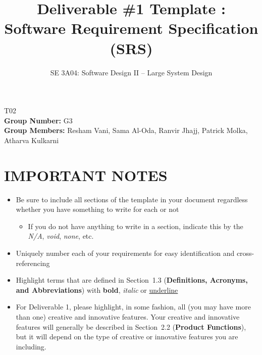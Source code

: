 \documentclass[]{article}
\title{Deliverable \#1 Template : Software Requirement Specification (SRS)}
\author{SE 3A04: Software Design II -- Large System Design}
\date{}
\begin{document}







\maketitle	
{} T02\\
{\bf Group Number:} G3 \\
{\bf Group Members:} Resham Vani, Sama Al-Oda, Ranvir Jhajj, Patrick Molka, Atharva Kulkarni

\section*{IMPORTANT NOTES}
\begin{itemize}
	\item Be sure to include all sections of the template in your document regardless whether you have something to write for each or not
	\begin{itemize}
		\item If you do not have anything to write in a section, indicate this by the \emph{N/A}, \emph{void}, \emph{none}, etc.
	\end{itemize}
	\item Uniquely number each of your requirements for easy identification and cross-referencing
	\item Highlight terms that are defined in Section~1.3 (\textbf{Definitions, Acronyms, and Abbreviations}) with \textbf{bold}, \emph{italic} or \underline{underline}
	\item For Deliverable 1, please highlight, in some fashion, all (you may have more than one) creative and innovative features. Your creative and innovative features will generally be described in Section~2.2 (\textbf{Product Functions}), but it will depend on the type of creative or innovative features you are including.
\end{itemize}

\introduction


\product


\usecase



\textcolor{red}{\functional}

\end{document}
